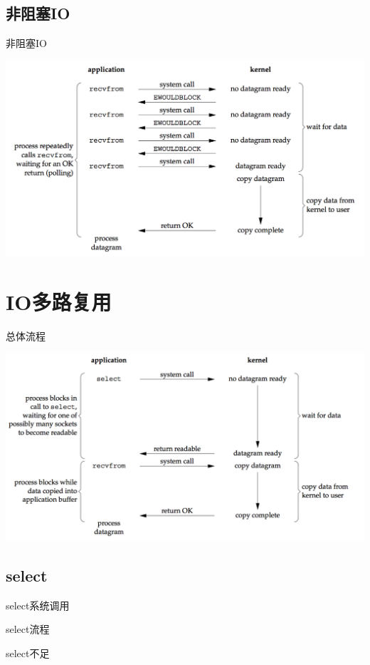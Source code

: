 \documentclass[UTF8]{beamer}
\begin{document}
\subsection{非阻塞IO}
\begin{frame}{非阻塞IO}
  \centerline{\includegraphics[width=\textwidth]{img/non-block.png}}
\end{frame}
\section{IO多路复用}
\begin{frame}{总体流程}
  \centerline{\includegraphics[width=\textwidth]{img/multi-io.png}}
\end{frame}
\subsection{select}
\begin{frame}[fragile]{select系统调用}
  \begin{ccode}
  \end{ccode}
\end{frame}
\begin{frame}[fragile]{select流程}
  \begin{ccode}
  \end{ccode}
\end{frame}
\begin{frame}[fragile]{select不足}
  \begin{ccode}
  \end{ccode}
\end{frame}
\end{document}
